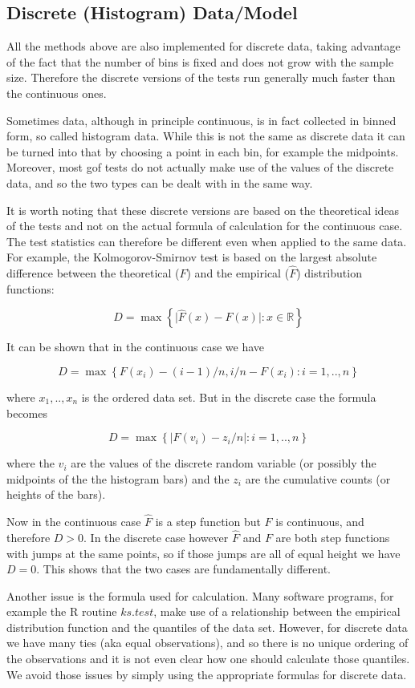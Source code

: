 \documentclass[]{svjour3}
\begin{document}
\subsection{Discrete (Histogram) Data/Model}


All the methods above are also implemented for discrete data, taking
advantage of the fact that the number of bins is fixed and does not grow
with the sample size. Therefore the discrete versions of the tests run
generally much faster than the continuous ones.

Sometimes data, although in principle continuous, is in fact collected in binned form, so called histogram data. While this is not the same as discrete data it can be turned into that by choosing a point in each bin, for example the midpoints. Moreover, most gof tests do not actually make use of the values of the discrete data, and so the two types can be dealt with in the same way. 

It is worth noting that these discrete versions are based on the
theoretical ideas of the tests and not on the actual formula of
calculation for the continuous case. The test statistics can therefore
be different even when applied to the same data. For example, the
Kolmogorov-Smirnov test is based on the largest absolute difference
between the theoretical (\(F\)) and the empirical (\(\hat{F}\))
distribution functions:

$$D=\max\left\{\vert\hat{F}(x)-F(x) \vert: x\in \mathbb{R} \right\}$$

It can be shown that in the continuous case we have

\[D=\max\left\{F(x_i)-(i-1)/n, i/n-F(x_i):i=1,..,n \right\}\]

where \(x_1,..,x_n\) is the ordered data set. But in the discrete case
the formula becomes

\[D=\max\left\{ \vert F(v_i)-z_i/n\vert:i=1,..,n \right\}\]

where the \(v_i\) are the values of the discrete random variable (or
possibly the midpoints of the the histogram bars) and the \(z_i\) are
the cumulative counts (or heights of the bars).

Now in the continuous case \(\hat{F}\) is a step function but \(F\) is
continuous, and therefore \(D>0\). In the discrete case however
\(\hat{F}\) and \(F\) are both step functions with jumps at the same
points, so if those jumps are all of equal height we have \(D=0\). This
shows that the two cases are fundamentally different.

Another issue is the formula used for calculation. Many software
programs, for example the R routine \(ks.test\), make use of a
relationship between the empirical distribution function and the
quantiles of the data set. However, for discrete data we have many
ties (aka equal observations), and so there is no unique ordering of the
observations and it is not even clear how one should calculate those
quantiles. We avoid those issues by simply using the appropriate
formulas for discrete data.
\end{document}

